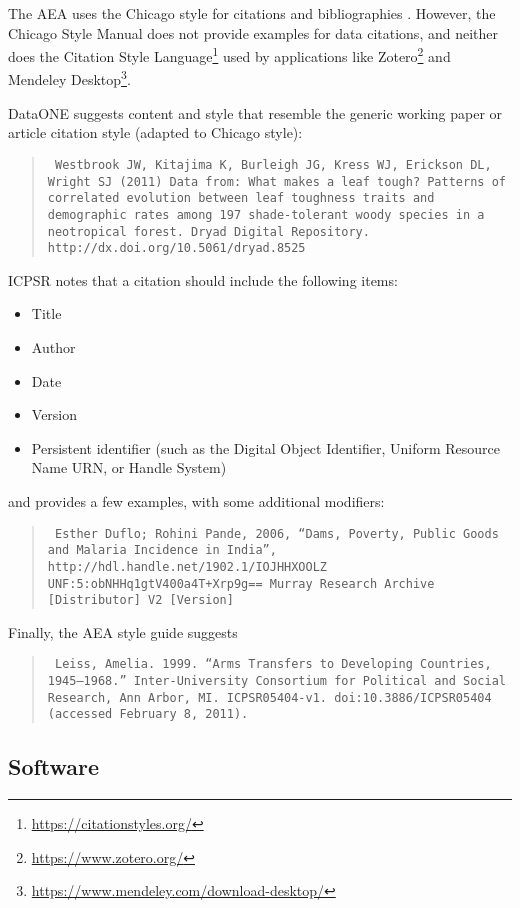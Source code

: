 \documentclass[AEJ]{AEA}
\begin{document}
The AEA uses the Chicago style for citations and bibliographies \citep{aeadatarefs}. However, the Chicago Style Manual \citep{citation-machine,ChicagoManualofStyleChicagoManualStyle2018} does not provide examples for data citations, and neither does the Citation Style Language\footnote{\url{https://citationstyles.org/}} used by applications like Zotero\footnote{\url{https://www.zotero.org/}} and Mendeley Desktop\footnote{\url{https://www.mendeley.com/download-desktop/}}.


DataONE \citep{dataone-cite} suggests content and style that resemble the generic working paper or article citation style (adapted to Chicago style):
\begin{quote}\tt
    Westbrook JW, Kitajima K, Burleigh JG, Kress WJ, Erickson DL, Wright SJ (2011) Data from: What makes a leaf tough? Patterns of correlated evolution between leaf toughness traits and demographic rates among 197 shade-tolerant woody species in a neotropical forest. Dryad Digital Repository. http://dx.doi.org/10.5061/dryad.8525
\end{quote}
ICPSR \citep{icpsr-data-cite} notes  that a citation should include the following items:
\begin{itemize}
    \item   Title
    \item   Author
    \item   Date
    \item   Version
    \item   Persistent identifier (such as the Digital Object Identifier, Uniform Resource Name URN, or Handle System)
\end{itemize}
and provides a few examples, with some additional modifiers:
\begin{quote}\tt
    Esther Duflo; Rohini Pande, 2006, ``Dams, Poverty, Public Goods and Malaria Incidence in India'', http://hdl.handle.net/1902.1/IOJHHXOOLZ UNF:5:obNHHq1gtV400a4T+Xrp9g== Murray Research Archive [Distributor] V2 [Version]
\end{quote}
Finally, the AEA style guide \citep{aeadatarefs} suggests
\begin{quote}\tt
    Leiss, Amelia. 1999. ``Arms Transfers to Developing Countries, 1945--1968.'' 
    Inter-University Consortium for Political and Social Research, Ann Arbor, MI. 
    ICPSR05404-v1. doi:10.3886/ICPSR05404 (accessed February 8, 2011).
\end{quote}

\subsection{Software}
\end{document}
